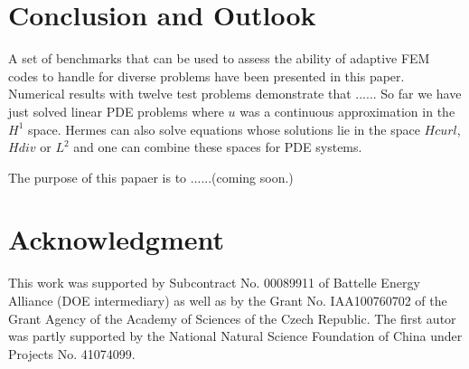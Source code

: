 \section{Conclusion and Outlook}
\label{sec:conclusion}

A set of benchmarks that can be used to assess the
ability of adaptive FEM codes to handle for diverse
problems have been presented in this paper.
Numerical results with twelve test problems demonstrate
that ......
So far we have just solved linear PDE problems where $u$ 
was a continuous approximation in the $H^1$ space. 
Hermes can also solve equations whose solutions lie in the space
$Hcurl$, $Hdiv$ or $L^2$ and one can combine these spaces for PDE systems.


The purpose of this papaer is to ......(coming soon.)

\section{Acknowledgment}

This work was supported by Subcontract No. 00089911 of Battelle
Energy Alliance (DOE intermediary) as well as by the
Grant No. IAA100760702 of the Grant Agency of the Academy
of Sciences of the Czech Republic. The first autor was partly
supported by the National Natural Science Foundation
of China under Projects No. 41074099.
